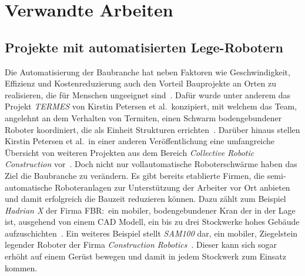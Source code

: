 \chapter{Verwandte Arbeiten}\label{related}
\section{Projekte mit automatisierten Lege-Robotern}
Die Automatisierung der Baubranche hat neben Faktoren wie Geschwindigkeit, Effizienz und Kostenreduzierung auch den Vorteil Bauprojekte an Orten zu realisieren, die für Menschen ungeeignet sind~\cite{Petersen2012}.
Dafür wurde unter anderem das Projekt \textit{TERMES} von Kirstin Petersen et al.\ konzipiert, mit welchem das Team, angelehnt an dem Verhalten von Termiten, einen Schwarm bodengebundener Roboter koordiniert, die als Einheit Strukturen errichten~\cite{Petersen2012}.
Darüber hinaus stellen Kirstin Petersen et al.\ in einer anderen Veröffentlichung eine umfangreiche Übersicht von weiteren Projekten aus dem Bereich \textit{Collective Robotic Construction} vor~\cite{Petersen2019}.
Doch nicht nur vollautomatische Roboterschwärme haben das Ziel die Baubranche zu verändern.
Es gibt bereits etablierte Firmen, die semi-automatische Roboteranlagen zur Unterstützung der Arbeiter vor Ort anbieten und damit erfolgreich die Bauzeit reduzieren können.
Dazu zählt zum Beispiel \textit{Hadrian X} der Firma FBR:\ ein mobiler, bodengebundener Kran der in der Lage ist, ausgehend von einem CAD Modell, ein bis zu drei Stockwerke hohes Gebäude aufzuschichten~\cite{HadrianX}.
Ein weiteres Beispiel stellt \textit{SAM100} dar, ein mobiler, Ziegelstein legender Roboter der Firma \textit{Construction Robotics}~\cite{SAM}.
Dieser kann sich sogar erhöht auf einem Gerüst bewegen und damit in jedem Stockwerk zum Einsatz kommen.

